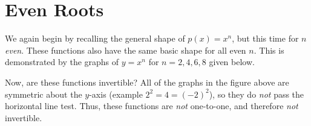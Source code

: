 \documentclass{ximera}
\begin{document}
\section{Even Roots}
We again begin by recalling the general shape of $p(x) = x^n$, but this time for $n$ {\em even}. These functions also have the same basic shape for all even $n$. This is demonstrated by the graphs of $y = x^n$ for $n = 2,4,6,8$ given below.

\begin{image}
\end{image}

Now, are these functions invertible? All of the graphs in the figure above are symmetric about the $y$-axis (example $2^2 = 4 = (-2)^2$), so they do {\em not} pass the horizontal line test. Thus, these functions are {\em not} one-to-one, and therefore {\em not} invertible.
\end{document}
